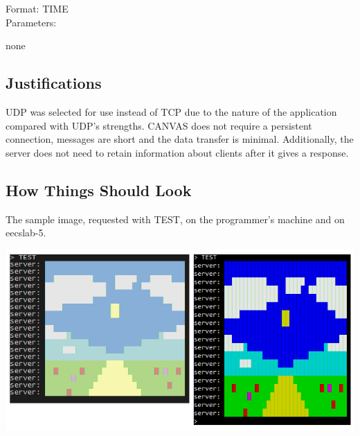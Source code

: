 \documentclass[letterpaper]{article}
\begin{document}
\begin{adjustwidth}{2em}{0em}
    Format: TIME\\
    Parameters:
    \begin{adjustwidth}{1em}{0em}
    none
    \end{adjustwidth}
\end{adjustwidth}

\subsection*{Justifications}

UDP was selected for use instead of TCP due to the nature of the application
compared with UDP's strengths. CANVAS does not require a persistent connection,
messages are short and the data transfer is minimal. Additionally, the server
does not need to retain information about clients after it gives a response.

\subsection*{How Things Should Look}

The sample image, requested with TEST, on the programmer's machine and on eecslab-5.

\includegraphics[scale=0.9]{test.png}
\end{document}
